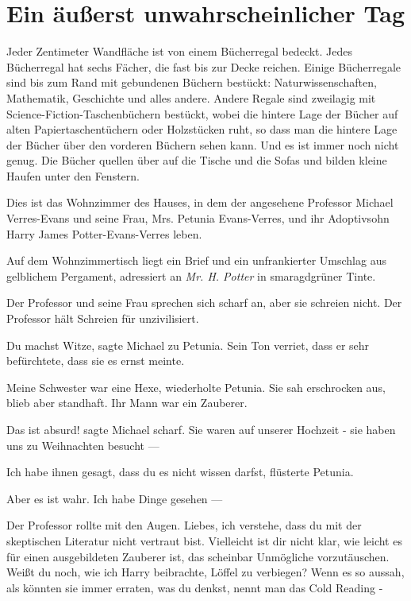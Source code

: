 \chapter{Ein äußerst unwahrscheinlicher Tag}

Jeder Zentimeter Wandfläche ist von einem Bücherregal bedeckt.
Jedes Bücherregal hat sechs Fächer, die fast bis zur Decke reichen. Einige
Bücherregale sind bis zum Rand mit gebundenen Büchern bestückt:
Naturwissenschaften, Mathematik, Geschichte und alles andere. Andere Regale sind
zweilagig mit Science-Fiction-Taschenbüchern bestückt, wobei die hintere Lage
der Bücher auf alten Papiertaschentüchern oder Holzstücken ruht, so dass man die
hintere Lage der Bücher über den vorderen Büchern sehen kann. Und es ist immer
noch nicht genug. Die Bücher quellen über auf die Tische und die Sofas und
bilden kleine Haufen unter den Fenstern.

Dies ist das Wohnzimmer des Hauses, in dem der angesehene Professor Michael
Verres-Evans und seine Frau, Mrs. Petunia Evans-Verres, und ihr Adoptivsohn
Harry James Potter-Evans-Verres leben.

Auf dem Wohnzimmertisch liegt ein Brief und ein unfrankierter Umschlag aus
gelblichem Pergament, adressiert an \emph{Mr. H. Potter} in smaragdgrüner Tinte.

Der Professor und seine Frau sprechen sich scharf an, aber sie schreien nicht.
Der Professor hält Schreien für unzivilisiert.

\glqq{}Du machst Witze\grqq{}, sagte Michael zu Petunia. Sein Ton verriet, dass
er sehr befürchtete, dass sie es ernst meinte.

\glqq{}Meine Schwester war eine Hexe\grqq{}, wiederholte Petunia. Sie sah
erschrocken aus, blieb aber standhaft. \glqq{}Ihr Mann war ein Zauberer.\grqq{}

\glqq{}Das ist absurd!\grqq{} sagte Michael scharf. \glqq{}Sie waren auf unserer
Hochzeit - sie haben uns zu Weihnachten besucht ---\grqq{}

\glqq{}Ich habe ihnen gesagt, dass du es nicht wissen darfst\grqq{}, flüsterte
Petunia.

\glqq{}Aber es ist wahr. Ich habe Dinge gesehen ---\grqq{}

Der Professor rollte mit den Augen. \glqq{}Liebes, ich verstehe, dass du mit der
skeptischen Literatur nicht vertraut bist. Vielleicht ist dir nicht klar, wie
leicht es für einen ausgebildeten Zauberer ist, das scheinbar Unmögliche
vorzutäuschen. Weißt du noch, wie ich Harry beibrachte, Löffel zu verbiegen?
Wenn es so aussah, als könnten sie immer erraten, was du denkst, nennt man das
Cold Reading -\grqq{}

